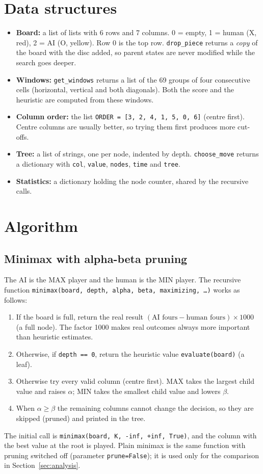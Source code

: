\documentclass[11pt,a4paper]{article}
\begin{document}
\section{Data structures}
\begin{itemize}
  \item \textbf{Board:} a list of lists with 6 rows and 7 columns. 0 = empty, 1 = human
  (X, red), 2 = AI (O, yellow). Row 0 is the top row. \texttt{drop\_piece} returns a
  \emph{copy} of the board with the disc added, so parent states are never modified
  while the search goes deeper.
  \item \textbf{Windows:} \texttt{get\_windows} returns a list of the 69 groups of four
  consecutive cells (horizontal, vertical and both diagonals). Both the score and the
  heuristic are computed from these windows.
  \item \textbf{Column order:} the list \texttt{ORDER = [3, 2, 4, 1, 5, 0, 6]} (centre
  first). Centre columns are usually better, so trying them first produces more
  cut-offs.
  \item \textbf{Tree:} a list of strings, one per node, indented by depth.
  \texttt{choose\_move} returns a dictionary with \texttt{col}, \texttt{value},
  \texttt{nodes}, \texttt{time} and \texttt{tree}.
  \item \textbf{Statistics:} a dictionary holding the node counter, shared by the
  recursive calls.
\end{itemize}

\section{Algorithm}
\subsection{Minimax with alpha-beta pruning}
The AI is the MAX player and the human is the MIN player. The recursive function
\texttt{minimax(board, depth, alpha, beta, maximizing, \dots)} works as follows:
\begin{enumerate}
  \item If the board is full, return the real result
  $(\text{AI fours}-\text{human fours})\times 1000$ (a full node). The factor 1000 makes
  real outcomes always more important than heuristic estimates.
  \item Otherwise, if \texttt{depth == 0}, return the heuristic value
  \texttt{evaluate(board)} (a leaf).
  \item Otherwise try every valid column (centre first). MAX takes the largest child
  value and raises $\alpha$; MIN takes the smallest child value and lowers $\beta$.
  \item When $\alpha \ge \beta$ the remaining columns cannot change the decision, so they
  are skipped (pruned) and printed in the tree.
\end{enumerate}
The initial call is \texttt{minimax(board, K, -inf, +inf, True)}, and the column with the
best value at the root is played. Plain minimax is the same function with pruning
switched off (parameter \texttt{prune=False}); it is used only for the comparison in
Section~\ref{sec:analysis}.
\end{document}
